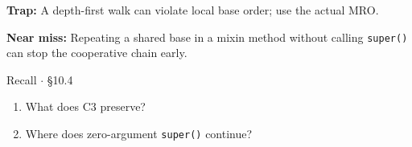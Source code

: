 \documentclass[11pt]{article}
\begin{document}
\begin{keepsection}
\begin{notebox}\textbf{Trap:} A depth-first walk can violate local base order; use the actual MRO.\end{notebox}

\begin{notebox}\textbf{Near miss:} Repeating a shared base in a mixin method without calling \texttt{super()} can stop the cooperative chain early.\end{notebox}

\begin{recallbox}{Recall \ensuremath{\cdot} §10.4}
\begin{enumerate}
\item What does C3 preserve?
\item Where does zero-argument \texttt{super()} continue?
\end{enumerate}

\end{recallbox}
\end{keepsection}
\end{document}
